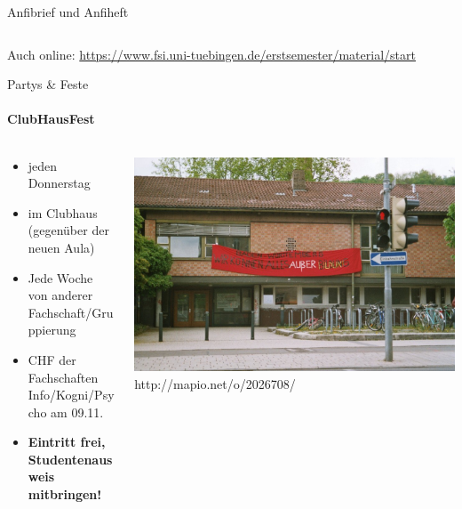\documentclass{beamer}
\begin{document}
\begin{frame}{Anfibrief und Anfiheft}
\begin{columns}
\begin{column}{.5\linewidth}
			\end{column}
		\end{columns}
		Auch online: \url{https://www.fsi.uni-tuebingen.de/erstsemester/material/start}
	\end{frame}
			
	\begin{frame}{Partys \& Feste}
		\framesubtitle{ClubHausFest}
		\begin{columns}
			\begin{column}{.6\linewidth}
				\begin{itemize}
					\item jeden Donnerstag
					\item im Clubhaus (gegenüber der neuen Aula)
					\item Jede Woche von anderer Fachschaft/Gruppierung
					\item CHF der Fachschaften Info/Kogni/Psycho am 09.11.
					\item \textbf{Eintritt frei, Studentenausweis mitbringen!}
				\end{itemize}
			\end{column}
			\begin{column}{.4\linewidth}
				\includegraphics[width=\linewidth]{pictures/clubhaus.jpg} \\
				\footnotesize http://mapio.net/o/2026708/
			\end{column}
		\end{columns}
	\end{frame}
\end{document}
